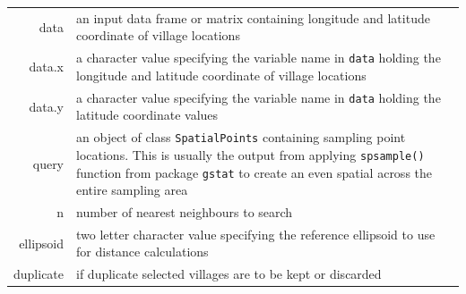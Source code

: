 \documentclass[11pt,a4paper]{article}
\begin{document}
\begin{longtable}[]{@{}rl@{}}
\toprule
\begin{minipage}[t]{0.15\columnwidth}\raggedleft
data\strut
\end{minipage} & \begin{minipage}[t]{0.79\columnwidth}\raggedright
an input data frame or matrix containing longitude and latitude
coordinate of village locations\strut
\end{minipage}\tabularnewline
\begin{minipage}[t]{0.15\columnwidth}\raggedleft
data.x\strut
\end{minipage} & \begin{minipage}[t]{0.79\columnwidth}\raggedright
a character value specifying the variable name in \texttt{data} holding
the longitude and latitude coordinate of village locations\strut
\end{minipage}\tabularnewline
\begin{minipage}[t]{0.15\columnwidth}\raggedleft
data.y\strut
\end{minipage} & \begin{minipage}[t]{0.79\columnwidth}\raggedright
a character value specifying the variable name in \texttt{data} holding
the latitude coordinate values\strut
\end{minipage}\tabularnewline
\begin{minipage}[t]{0.15\columnwidth}\raggedleft
query\strut
\end{minipage} & \begin{minipage}[t]{0.79\columnwidth}\raggedright
an object of class \texttt{SpatialPoints} containing sampling point
locations. This is usually the output from applying \texttt{spsample()}
function from package \texttt{gstat} to create an even spatial across
the entire sampling area\strut
\end{minipage}\tabularnewline
\begin{minipage}[t]{0.15\columnwidth}\raggedleft
n\strut
\end{minipage} & \begin{minipage}[t]{0.79\columnwidth}\raggedright
number of nearest neighbours to search\strut
\end{minipage}\tabularnewline
\begin{minipage}[t]{0.15\columnwidth}\raggedleft
ellipsoid\strut
\end{minipage} & \begin{minipage}[t]{0.79\columnwidth}\raggedright
two letter character value specifying the reference ellipsoid to use for
distance calculations\strut
\end{minipage}\tabularnewline
\begin{minipage}[t]{0.15\columnwidth}\raggedleft
duplicate\strut
\end{minipage} & \begin{minipage}[t]{0.79\columnwidth}\raggedright
if duplicate selected villages are to be kept or discarded\strut
\end{minipage}\tabularnewline
\bottomrule
\end{longtable}
\end{document}
